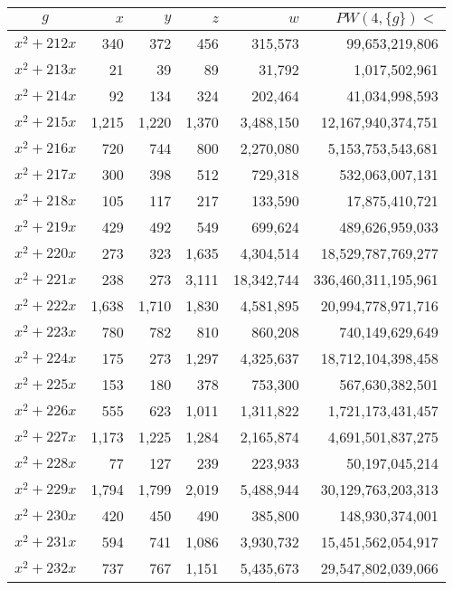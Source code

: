 \documentclass{article}
\begin{document}
\begin{center}
\begin{tabular}{ | c | r | r | r | r | r | }
$g$ & $x$ & $y$ & $z$ & $w$ & $PW(4, \{g\}) <$ \\ \hline
$x^2 + 212x$ & 340 & 372 & 456 & 315{,}573 & 99{,}653{,}219{,}806 \\ \hline
$x^2 + 213x$ & 21 & 39 & 89 & 31{,}792 & 1{,}017{,}502{,}961 \\ \hline
$x^2 + 214x$ & 92 & 134 & 324 & 202{,}464 & 41{,}034{,}998{,}593 \\ \hline
$x^2 + 215x$ & 1{,}215 & 1{,}220 & 1{,}370 & 3{,}488{,}150 & 12{,}167{,}940{,}374{,}751 \\ \hline
$x^2 + 216x$ & 720 & 744 & 800 & 2{,}270{,}080 & 5{,}153{,}753{,}543{,}681 \\ \hline
$x^2 + 217x$ & 300 & 398 & 512 & 729{,}318 & 532{,}063{,}007{,}131 \\ \hline
$x^2 + 218x$ & 105 & 117 & 217 & 133{,}590 & 17{,}875{,}410{,}721 \\ \hline
$x^2 + 219x$ & 429 & 492 & 549 & 699{,}624 & 489{,}626{,}959{,}033 \\ \hline
$x^2 + 220x$ & 273 & 323 & 1{,}635 & 4{,}304{,}514 & 18{,}529{,}787{,}769{,}277 \\ \hline
$x^2 + 221x$ & 238 & 273 & 3{,}111 & 18{,}342{,}744 & 336{,}460{,}311{,}195{,}961 \\ \hline
$x^2 + 222x$ & 1{,}638 & 1{,}710 & 1{,}830 & 4{,}581{,}895 & 20{,}994{,}778{,}971{,}716 \\ \hline
$x^2 + 223x$ & 780 & 782 & 810 & 860{,}208 & 740{,}149{,}629{,}649 \\ \hline
$x^2 + 224x$ & 175 & 273 & 1{,}297 & 4{,}325{,}637 & 18{,}712{,}104{,}398{,}458 \\ \hline
$x^2 + 225x$ & 153 & 180 & 378 & 753{,}300 & 567{,}630{,}382{,}501 \\ \hline
$x^2 + 226x$ & 555 & 623 & 1{,}011 & 1{,}311{,}822 & 1{,}721{,}173{,}431{,}457 \\ \hline
$x^2 + 227x$ & 1{,}173 & 1{,}225 & 1{,}284 & 2{,}165{,}874 & 4{,}691{,}501{,}837{,}275 \\ \hline
$x^2 + 228x$ & 77 & 127 & 239 & 223{,}933 & 50{,}197{,}045{,}214 \\ \hline
$x^2 + 229x$ & 1{,}794 & 1{,}799 & 2{,}019 & 5{,}488{,}944 & 30{,}129{,}763{,}203{,}313 \\ \hline
$x^2 + 230x$ & 420 & 450 & 490 & 385{,}800 & 148{,}930{,}374{,}001 \\ \hline
$x^2 + 231x$ & 594 & 741 & 1{,}086 & 3{,}930{,}732 & 15{,}451{,}562{,}054{,}917 \\ \hline
$x^2 + 232x$ & 737 & 767 & 1{,}151 & 5{,}435{,}673 & 29{,}547{,}802{,}039{,}066 \\ \hline

\end{tabular}
\end{center}
\end{document}
